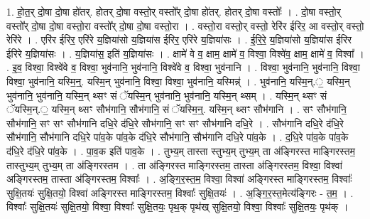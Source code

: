 \documentclass[17pt]{extarticle}
\begin{document}
1. हो॒त॒र् दो॒षा दो॒षा हो॑तर्. होतर् दो॒षा वस्तो॒र् वस्तो᳚र् दो॒षा हो॑तर्. होतर् दो॒षा वस्तोः᳚ । . दो॒षा वस्तो॒र् वस्तो᳚र् दो॒षा दो॒षा वस्तो॒रा वस्तो᳚र् दो॒षा दो॒षा वस्तो॒रा । . वस्तो॒रा वस्तो॒र् वस्तो॒ रेरि॑र ईरिर॒ आ वस्तो॒र् वस्तो॒ रेरि॑रे । . एरि॑र ईरिर॒ एरि॑रे य॒ज्ञिया॑सो य॒ज्ञिया॑स ईरिर॒ एरि॑रे य॒ज्ञिया॑सः । . ई॒रि॒रे॒ य॒ज्ञिया॑सो य॒ज्ञिया॑स ईरिर ईरिरे य॒ज्ञिया॑सः । . य॒ज्ञिया॑स॒ इति॑ य॒ज्ञिया॑सः । . क्षामे॑ वे व॒ क्षाम॒ क्षामे॑ व॒ विश्वा॒ विश्वे॑व॒ क्षाम॒ क्षामे॑ व॒ विश्वा᳚ । . इ॒व॒ विश्वा॒ विश्वे॑वे व॒ विश्वा॒ भुव॑नानि॒ भुव॑नानि॒ विश्वे॑वे व॒ विश्वा॒ भुव॑नानि । . विश्वा॒ भुव॑नानि॒ भुव॑नानि॒ विश्वा॒ विश्वा॒ भुव॑नानि॒ यस्मि॒न्॒. यस्मि॒न् भुव॑नानि॒ विश्वा॒ विश्वा॒ भुव॑नानि॒ यस्मिन्न्॑ । . भुव॑नानि॒ यस्मि॒न्.॒ यस्मि॒न् भुव॑नानि॒ भुव॑नानि॒ यस्मि॒न् थ्सꣳ सं ॅयस्मि॒न् भुव॑नानि॒ भुव॑नानि॒ यस्मि॒न् थ्सम् । . यस्मि॒न् थ्सꣳ सं ॅयस्मि॒न्.॒ यस्मि॒न् थ्सꣳ सौभ॑गानि॒ सौभ॑गानि॒ सं ॅयस्मि॒न्॒. यस्मि॒न् थ्सꣳ सौभ॑गानि । . सꣳ सौभ॑गानि॒ सौभ॑गानि॒ सꣳ सꣳ सौभ॑गानि दधि॒रे द॑धि॒रे सौभ॑गानि॒ सꣳ सꣳ सौभ॑गानि दधि॒रे । . सौभ॑गानि दधि॒रे द॑धि॒रे सौभ॑गानि॒ सौभ॑गानि दधि॒रे पा॑व॒के पा॑व॒के द॑धि॒रे सौभ॑गानि॒ सौभ॑गानि दधि॒रे पा॑व॒के । . द॒धि॒रे पा॑व॒के पा॑व॒के द॑धि॒रे द॑धि॒रे पा॑व॒के । . पा॒व॒क इति॑ पाव॒के । . तुभ्य॒म् तास्ता स्तुभ्य॒म् तुभ्य॒म् ता अ॑ङ्गिरस्त माङ्गिरस्तम॒ तास्तुभ्य॒म् तुभ्य॒म् ता अ॑ङ्गिरस्तम । . ता अ॑ङ्गिरस्त माङ्गिरस्तम॒ तास्ता अ॑ङ्गिरस्तम॒ विश्वा॒ विश्वा॑ अङ्गिरस्तम॒ तास्ता अ॑ङ्गिरस्तम॒ विश्वाः᳚ । . अ॒ङ्गि॒र॒स्त॒म॒ विश्वा॒ विश्वा॑ अङ्गिरस्त माङ्गिरस्तम॒ विश्वाः᳚ सुक्षि॒तयः॑ सुक्षि॒तयो॒ विश्वा॑ अङ्गिरस्त माङ्गिरस्तम॒ विश्वाः᳚ सुक्षि॒तयः॑ । . अ॒ङ्गि॒र॒स्त॒मेत्य॑ङ्गिरः - त॒म॒ । . विश्वाः᳚ सुक्षि॒तयः॑ सुक्षि॒तयो॒ विश्वा॒ विश्वाः᳚ सुक्षि॒तयः॒ पृथ॒क् पृथ॑ख् सुक्षि॒तयो॒ विश्वा॒ विश्वाः᳚ सुक्षि॒तयः॒ पृथ॑क् । \newline
\end{document}

